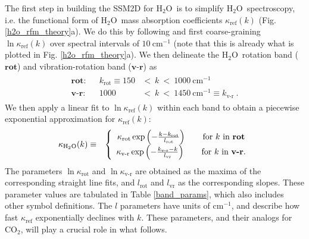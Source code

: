 \documentclass{ametsoc}
\newcommand{\beqa}{\begin{eqnarray}}
\newcommand{\eeqa}{\end{eqnarray}}
\newcommand{\cminverse}{\ensuremath{\mathrm{cm^{-1}}}}
\newcommand{\cotwo}{\ensuremath{\mathrm{CO_2}}}
\newcommand{\htwo}{\ensuremath{\mathrm{H_2O}}}
\newcommand{\kapparef}{\ensuremath{\kappa_{\mathrm{ref}}}}
\newcommand{\kapparot}{\ensuremath{\kappa_{\mathrm{rot}}}}
\newcommand{\kappavr}{\ensuremath{\kappa_{\text{v-r}}}}
\newcommand{\krot}{\ensuremath{k_\mathrm{rot}}}
\newcommand{\kvr}{\ensuremath{k_\text{v-r}}}
\newcommand{\lrot}{\ensuremath{l_\mathrm{rot}}}
\newcommand{\lvr}{\ensuremath{l_\mathrm{vr}}}
\newcommand{\vr}{\ensuremath{\textbf{v-r}}}
\newcommand{\rot}{\ensuremath{\textbf{rot}}}
\begin{document}
The first step in building the SSM2D for \htwo\ is to simplify \htwo\ spectroscopy, i.e. the functional form of \htwo\ mass absorption coefficients $\kapparef(k)$ (Fig. \ref{h2o_rfm_theory}a). We do this by following \cite{wilson2012} and first coarse-graining $\ln \kapparef(k)$ over spectral intervals of $10 \ \cminverse$ (note that this is already what is plotted in Fig. \ref{h2o_rfm_theory}a). We then delineate the  \htwo\ rotation band (\rot) and vibration-rotation band (\vr)  as
\beqa
	\begin{split}
	    \rot :  & & \krot \equiv 150 & <\  k\  < \ 1000\ \cminverse \\
    		\vr : & &  1000 & < \  k\ <\  1450\ \cminverse \equiv \kvr   \ .
	\end{split}
	\label{h2o_bands}
\eeqa
 We then apply a linear fit to $\ln \kapparef(k)$ within each band  to obtain a piecewise exponential approximation for $\kapparef(k)$:
 \beqa
 	\kappa_{\htwo}(k) & \equiv & \left\{ \begin{array}{cr} 
													\kapparot \exp\left(-\frac{k-\krot}{\lrot}\right) \quad \quad \text{for $k$ in \rot}  \\
												    \kappavr \exp\left(-\frac{\kvr-k}{\lvr}\right)   \quad \quad \text{for $k$ in \vr} .
												      \end{array} \right.          
\label{kappa_h2o}
 \eeqa
The parameters $\ln\kapparot$ and $\ln \kappavr$ are obtained as the maxima of the corresponding straight line fits, and $\lrot$ and $\lvr$ as the corresponding slopes. These parameter values are tabulated in Table \ref{band_params}, which also includes other symbol definitions. The $l$ parameters have units of \cminverse, and describe how fast $\kapparef$ exponentially declines with $k$. These parameters, and their analogs for \cotwo, will play a crucial role in what follows.
 
\end{document}
